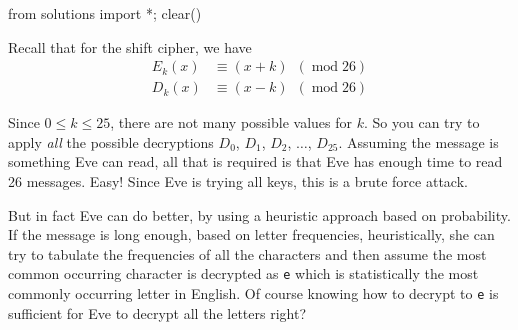 \begin{python0}
from solutions import *; clear()
\end{python0}

Recall that for the shift cipher, we have
\begin{align*}
 E_k(x) &\equiv (x+k) \,\,\,(\operatorname{mod} 26) \\
 D_k(x) &\equiv (x-k) \,\,\,(\operatorname{mod} 26)
\end{align*}

Since $0 \leq k \leq 25$, there are not many possible values for
$k$. So you can try to apply
\textit{all} the possible decryptions
$D_0$, $D_1$, $D_2$, $\ldots$, $D_{25}$. Assuming the message is
something Eve can read, all that is required is that Eve has
enough time to read 26 messages. Easy!
Since Eve is trying all keys, this is a brute force attack.

But in fact Eve can do better, by using
a heuristic approach based on probability.
If the message is long enough, based
on letter frequencies, heuristically, she can try to tabulate the
frequencies of all the characters and then assume the most common
occurring character is decrypted as \texttt{e} which is
statistically the most commonly occurring letter in English.
 Of course knowing
how to decrypt to \texttt{e} is sufficient for Eve to decrypt all
the letters right?

